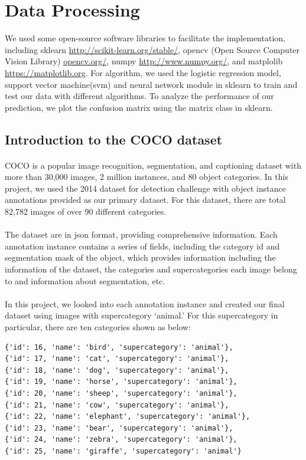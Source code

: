\documentclass{article}
\begin{document}
\section{Data Processing}
\label{gen_inst}
We used some open-source software libraries to facilitate the implementation, including sklearn \url{http://scikit-learn.org/stable/}, opencv (Open Source Computer Vision Library) \url{opencv.org/}, numpy \url{http://www.numpy.org/}, and matplolib \url{https://matplotlib.org}. For algorithm, we used the logistic regression model, support vector machine(svm) and neural network module in sklearn to train and test our data with different algorithms. To analyze the performance of our prediction, we plot the confusion matrix using the matrix class in sklearn.
\subsection{Introduction to the COCO dataset}

\paragraph{}
COCO is a popular image recognition, segmentation, and captioning dataset with more than 30,000 images, 2 million instances, and 80 object categories. In this project, we used the 2014 dataset for detection challenge with object instance annotations provided as our primary dataset. For this dataset, there are total 82,782 images of over 90 different categories. 
\paragraph{}
The dataset are in json format, providing comprehensive information. Each annotation instance contains a series of fields, including the category id and segmentation mask of the object, which provides information including the information of the dataset, the categories and supercategories each image belong to and information about segmentation, etc.
\paragraph{}
In this project, we looked into each annotation instance and created our final dataset using images with supercategory ‘animal.’ For this supercategory in particular, there are ten categories shown as below:

\begin{verbatim}
{'id': 16, 'name': 'bird', 'supercategory': 'animal'},
{'id': 17, 'name': 'cat', 'supercategory': 'animal'},
{'id': 18, 'name': 'dog', 'supercategory': 'animal'},
{'id': 19, 'name': 'horse', 'supercategory': 'animal'},
{'id': 20, 'name': 'sheep', 'supercategory': 'animal'},
{'id': 21, 'name': 'cow', 'supercategory': 'animal'},
{'id': 22, 'name': 'elephant', 'supercategory': 'animal'},
{'id': 23, 'name': 'bear', 'supercategory': 'animal'},
{'id': 24, 'name': 'zebra', 'supercategory': 'animal'},
{'id': 25, 'name': 'giraffe', 'supercategory': 'animal'}
\end{verbatim}
\end{document}
